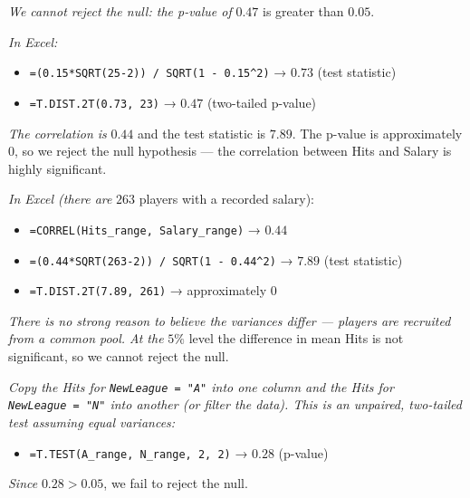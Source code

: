 \documentclass[
  11pt,
  letterpaper,
  DIV=11,
  numbers=noendperiod,
  oneside,
  open=any]{scrreprt}
\providecommand{\tightlist}{%
  \setlength{\itemsep}{0pt}\setlength{\parskip}{0pt}}\usepackage{longtable,booktabs,array}
\newenvironment{bsanswerkey}[2]{%
  \begin{tcolorbox}[bsbase, colback=bspaper2, colframe=bsline, fontupper=\small,
    title={\hypertarget{a-#1}{}\label{a-#1}\hyperlink{q-#1}{\textcolor{bsink2}{\MakeUppercase{#2}}}\hfill
      \hyperlink{q-#1}{\textcolor{bsaccent}{\normalfont\footnotesize back to page \pageref{q-#1}}}}]}%
  {\end{tcolorbox}}
\begin{document}
\begin{bsanswerkey}{bsans130}{Exercise 1, question 1}

\emph{We cannot reject the null: the p-value of} \(0.47\) is greater
than \(0.05\).

\emph{In Excel:}

\begin{itemize}
\tightlist
\item
  \texttt{=(0.15*SQRT(25-2))\ /\ SQRT(1\ -\ 0.15\^{}2)} → \(0.73\) (test
  statistic)
\item
  \texttt{=T.DIST.2T(0.73,\ 23)} → \(0.47\) (two-tailed p-value)
\end{itemize}

\end{bsanswerkey}

\begin{bsanswerkey}{bsans131}{Exercise 1, question 2}

\emph{The correlation is} \(0.44\) and the test statistic is \(7.89\).
The p-value is approximately \(0\), so we reject the null hypothesis ---
the correlation between Hits and Salary is highly significant.

\emph{In Excel (there are} \(263\) players with a recorded salary):

\begin{itemize}
\tightlist
\item
  \texttt{=CORREL(Hits\_range,\ Salary\_range)} → \(0.44\)
\item
  \texttt{=(0.44*SQRT(263-2))\ /\ SQRT(1\ -\ 0.44\^{}2)} → \(7.89\)
  (test statistic)
\item
  \texttt{=T.DIST.2T(7.89,\ 261)} → approximately \(0\)
\end{itemize}

\end{bsanswerkey}

\begin{bsanswerkey}{bsans132}{Exercise 2, question 1}

\emph{There is no strong reason to believe the variances differ ---
players are recruited from a common pool. At the} \(5\%\) level the
difference in mean Hits is not significant, so we cannot reject the
null.

\emph{Copy the Hits for \texttt{NewLeague\ =\ "A"} into one column and
the Hits for \texttt{NewLeague\ =\ "N"} into another (or filter the
data). This is an unpaired, two-tailed test assuming equal variances:}

\begin{itemize}
\tightlist
\item
  \texttt{=T.TEST(A\_range,\ N\_range,\ 2,\ 2)} → \(0.28\) (p-value)
\end{itemize}

\emph{Since} \(0.28 > 0.05\), we fail to reject the null.

\end{bsanswerkey}
\end{document}

